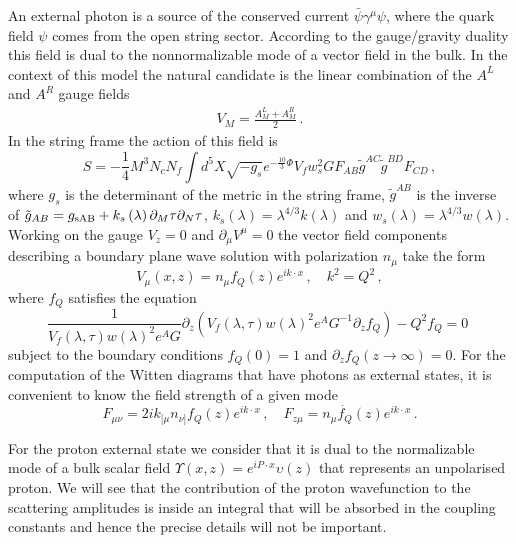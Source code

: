\documentclass[a4paper,12pt]{article}
\begin{document}
An external photon is a source of the conserved current $\bar{\psi} \gamma^\mu \psi$, where the quark field $\psi$ comes from the open string sector. According to the gauge/gravity duality this field is dual to the nonnormalizable mode of a vector field in the bulk. In the context of this model the natural candidate is the linear combination of the $A^L$ and $A^R$ gauge fields
\begin{align}
V_M = \frac{A^L_M + A^R_M}{2} \,.
\end{align}
In the string frame the action of this field is
\begin{equation}
S = - \frac{1}{4} M^3 N_c N_f \int d^5 X \sqrt{-g_s} e^{-\frac{10}{3} \Phi} V_f w_s^2 G F_{AB}\tilde{g}^{AC} \tilde{g}^{BD}F_{CD} \, ,
\label{eq:VM_new_action_string_frame}
\end{equation}
where $g_s$ is the determinant of the metric in the string frame, $\tilde{g}^{AB}$ is the inverse of $\tilde{g}_{AB} = g_{\rm{s} AB} +  k_s\left(\lambda\right) \partial_M \tau \partial_N \tau $, $k_s \left(\lambda\right) = \lambda^{4 / 3} k\left(\lambda\right) $ and $w_s \left(\lambda\right) = \lambda^{4 / 3} w\left(\lambda\right)$. Working on the gauge $V_z = 0$ and $\partial_\mu V^{\mu} = 0$ the vector field components describing a boundary plane wave solution with polarization $n_\mu$ take the form
\begin{equation}
V_\mu \left(x, z\right) = n_\mu f_Q \left(z\right) e^{i k \cdot x} \, , \quad k^2 = Q^2 \, ,
\end{equation}
where $f_Q$ satisfies the equation
\begin{equation}
\frac{1}{V_f(\lambda, \tau) w(\lambda)^2 e^A G} \partial_z (V_f(\lambda, \tau) w(\lambda)^2 e^A G^{-1} \partial_z f_Q) - Q^2 f_Q = 0 \, \,
\end{equation}
subject to the boundary conditions $f_Q\left(0\right) = 1$ and $\partial_z f_Q \left( z \to \infty \right) = 0$.
For the computation of the Witten diagrams that have photons as external states, it is convenient to know the field strength of a given mode
\begin{equation}
F_{\mu \nu} = 2 i k_{[ \mu} n_{\nu ]} f_Q (z) e^{i k \cdot x} \, , \quad F_{z \mu} = n_\mu \dot{f_Q} (z)e^{i k \cdot x} \, .
\label{eq:strength_tensor}
\end{equation}

For the proton external state we consider that it is dual to the normalizable mode of a bulk scalar field $\Upsilon\left(x, z\right) = e^{i P \cdot x} \upsilon\left(z\right)$ that represents an unpolarised proton. We will see that the contribution of the proton wavefunction to the scattering amplitudes is inside an integral that will be absorbed in the coupling constants and hence the precise details will not be important.
\end{document}
